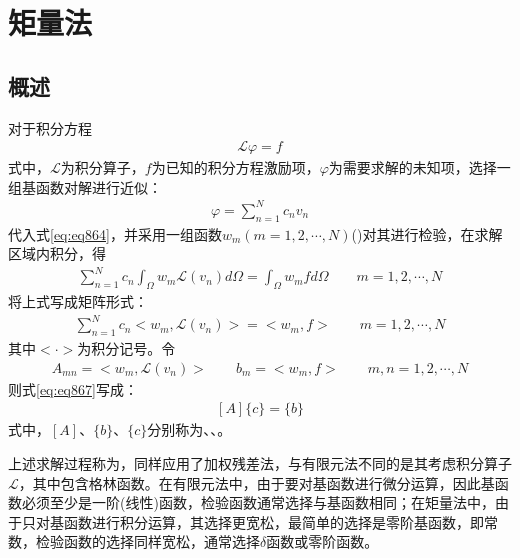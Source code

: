 \documentclass{article}
\numberwithin{equation}{section}
\renewcommand{\vec}[1]{\boldsymbol{#1}}
\begin{document}
\section{\textsf{矩量法}}
\subsection{概述}
对于积分方程
\begin{align}
    \label{eq:eq864}
    \vec{\mathcal{L}} \varphi=f
\end{align}
式中，$\vec{\mathcal{L}}$为积分算子，$f$为已知的积分方程激励项，$\varphi$为需要求解的未知项，选择一组基函数对解进行近似：
\begin{align}
    \label{eq:eq865}
    \varphi=\sum_{n=1}^{N}c_nv_n
\end{align}
代入式\ref{eq:eq864}，并采用一组函数$w_m(m=1,2,\cdots,N)$(\textbf{\color{blue}{权函数}})对其进行检验，在求解区域内积分，得
\begin{align}
    \label{eq:eq866}
    \sum_{n=1}^{N}c_n\int_{\Omega}w_m\vec{\mathcal{L}}(v_n)d\Omega=\int_{\Omega}w_mfd\Omega\qquad m=1,2,\cdots,N
\end{align}
将上式写成矩阵形式：
\begin{align}
    \label{eq:eq867}
    \sum_{n=1}^{N}c_n<w_m,\vec{\mathcal{L}}(v_n)>=<w_m,f>\qquad m=1,2,\cdots,N
\end{align}
其中$<\cdot>$为积分记号。令
\begin{align}
    \label{eq:eq868}
    A_{mn}=<w_m,\vec{\mathcal{L}}(v_n)>\qquad b_m=<w_m,f>\qquad m,n=1,2,\cdots,N
\end{align}
则式\ref{eq:eq867}写成：
\begin{align}
    \label{eq:eq868}
    [A]\{c\}=\{b\}
\end{align}
式中，$[A]$、$\{b\}$、$\{c\}$分别称为\textbf{\color{blue}{系数矩阵}}、\textbf{\color{blue}{源向量}}、\textbf{\color{blue}{未知向量}}。\par
上述求解过程称为\textbf{\color{blue}{矩量法(MoM)}}，同样应用了加权残差法，与有限元法不同的是其考虑积分算子$\vec{\mathcal{L}}$，其中包含格林函数。在有限元法中，由于要对基函数进行微分运算，因此基函数必须至少是一阶(线性)函数，检验函数通常选择与基函数相同；在矩量法中，由于只对基函数进行积分运算，其选择更宽松，最简单的选择是零阶基函数，即常数，检验函数的选择同样宽松，通常选择$\delta$函数或零阶函数。
\end{document}

